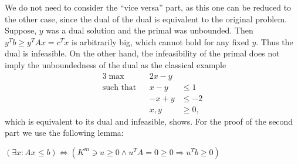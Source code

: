 \documentclass{scrartcl}
\newcommand\1{\mathbf{1}}
\begin{document}
We do not need to consider the \enquote{vice versa} part, as this one can be reduced to the other case, since the dual of the dual is equivalent to the original problem. Suppose, $y$ was a dual solution and the primal was unbounded. Then $y^Tb \ge y^TAx = c^T x$ is arbitrarily big, which cannot hold for any fixed $y$. Thus the dual is infeasible. On the other hand, the infeasibility of the primal does not imply the unboundedness of the dual as the classical example
\begin{alignat*}{3}
\max&& 2x-y \\
\text{such that} && x-y &\le 1 \\
&&-x+y &\le -2 \\
&&x,y &\ge 0,
\end{alignat*}
which is equivalent to its dual and infeasible, shows. For the proof of the second part we use the following lemma:
\begin{Lemma}[Farkas]\label{lem:farkas}
$(\exists x \colon  Ax \le b) \Leftrightarrow (K^m \ni u \ge 0\wedge u^TA=0 \ge 0 \Rightarrow u^Tb \ge 0)$
\end{Lemma}
\end{document}
